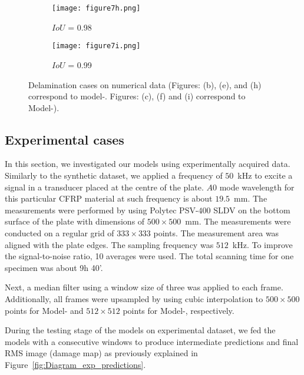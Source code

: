 \begin{figure}
\begin{subfigure}[b]{0.32\textwidth}
	\end{subfigure}
	\hfill	
	\begin{subfigure}[b]{0.32\textwidth}
		\centering
		\texttt{[image: figure7h.png]}
		\caption{\centering \(IoU\) = 0.98 }
		\label{fig:Convlstm_num_453}
	\end{subfigure}
	\hfill	
	\begin{subfigure}[b]{0.32\textwidth}
		\centering
		\texttt{[image: figure7i.png]}
		\caption{\centering \(IoU\) = 0.99}
		\label{fig:AE_num_453}
	\end{subfigure}
	\caption{Delamination cases on numerical data (Figures: (b), (e), and (h) correspond to model-. 
		Figures: (c), (f) and (i) correspond to Model-).}
	\label{fig:num_case}
\end{figure}
\twocolumn
\clearpage
\subsection{Experimental cases}
In this section, we investigated our models using experimentally acquired data.
Similarly to the synthetic dataset, we applied a frequency of \(50\)~kHz to excite a signal in a transducer placed at the centre of the plate. 
\(A0\) mode wavelength for this particular CFRP material at such frequency is about \(19.5\)~mm. 
The measurements were performed by using Polytec PSV-\(400\) SLDV on the bottom surface of the plate with dimensions of \(500\times 500\)~mm. 
The measurements were conducted on a regular grid of \(333\times333\) points. 
The measurement area was aligned with the plate edges.
The sampling frequency was \(512\)~kHz.
To improve the signal-to-noise ratio, 10 averages were used.
The total scanning time for one specimen was about 9h 40'.

Next, a median filter using a window size of three was applied to each frame. 
Additionally, all frames were upsampled by using cubic interpolation to \(500 \times 500\) points for Model- and \(512\times512\) points for Model-, respectively.

During the testing stage of the models on experimental dataset, we fed the 
models with a consecutive windows to produce intermediate predictions and final 
RMS image (damage map) as previously explained in 
Figure~\ref{fig:Diagram_exp_predictions}.

